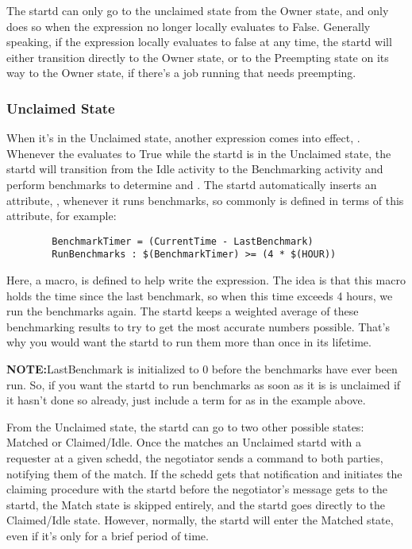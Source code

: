 The startd can only go to the unclaimed state from the Owner state,
and only does so when the  expression no longer locally
evaluates to False.  Generally speaking, if the 
expression locally evaluates to false at any time, the startd will
either transition directly to the Owner state, or to the Preempting
state on its way to the Owner state, if there's a job running that
needs preempting.

\subsubsection{Unclaimed State}
\label{sec:Unclaimed-State}

When it's in the Unclaimed state, another expression comes into
effect,  \label{param:RunBenchmarks}.  Whenever
the  evaluates to True while the startd is in the
Unclaimed state, the startd will transition from the Idle activity to
the Benchmarking activity and perform benchmarks to determine
 and .  The startd automatically inserts an
attribute, , whenever it runs benchmarks, so
commonly  is defined in terms of this attribute,
for example:

\begin{verbatim}
        BenchmarkTimer = (CurrentTime - LastBenchmark)
        RunBenchmarks : $(BenchmarkTimer) >= (4 * $(HOUR))
\end{verbatim}

Here, a macro,  is defined to help write the
expression.  The idea is that this macro holds the time since the last
benchmark, so when this time exceeds 4 hours, we run the benchmarks
again.  The startd keeps a weighted average of these benchmarking
results to try to get the most accurate numbers possible.  That's why
you would want the startd to run them more than once in its lifetime.

\textbf{NOTE:}LastBenchmark is initialized to 0 before the benchmarks
have ever been run.  So, if you want the startd to run benchmarks as
soon as it is is unclaimed if it hasn't done so already, just include
a term for  as in the example above.

From the Unclaimed state, the startd can go to two other possible
states: Matched or Claimed/Idle.  Once the  matches
an Unclaimed startd with a requester at a given schedd, the negotiator
sends a command to both parties, notifying them of the match.  If the
schedd gets that notification and initiates the claiming procedure
with the startd before the negotiator's message gets to the startd,
the Match state is skipped entirely, and the startd goes directly to
the Claimed/Idle state.  However, normally, the startd will enter the
Matched state, even if it's only for a brief period of time.


